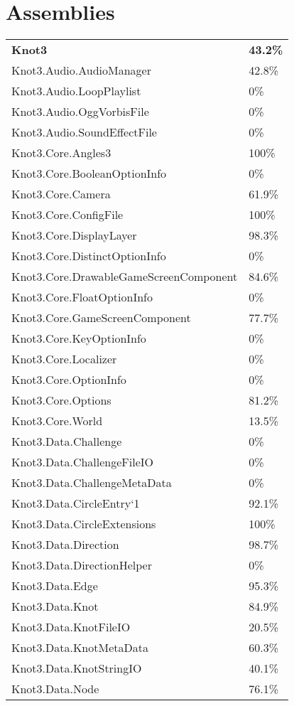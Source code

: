 \documentclass[a4paper,10pt]{article}
\begin{document}
\section{Assemblies}
\begin{longtable}[l]{ll}
\textbf{Knot3} & \textbf{43.2\%}\\
Knot3.Audio.AudioManager & 42.8\%\\
Knot3.Audio.LoopPlaylist & 0\%\\
Knot3.Audio.OggVorbisFile & 0\%\\
Knot3.Audio.SoundEffectFile & 0\%\\
Knot3.Core.Angles3 & 100\%\\
Knot3.Core.BooleanOptionInfo & 0\%\\
Knot3.Core.Camera & 61.9\%\\
Knot3.Core.ConfigFile & 100\%\\
Knot3.Core.DisplayLayer & 98.3\%\\
Knot3.Core.DistinctOptionInfo & 0\%\\
Knot3.Core.DrawableGameScreenComponent & 84.6\%\\
Knot3.Core.FloatOptionInfo & 0\%\\
Knot3.Core.GameScreenComponent & 77.7\%\\
Knot3.Core.KeyOptionInfo & 0\%\\
Knot3.Core.Localizer & 0\%\\
Knot3.Core.OptionInfo & 0\%\\
Knot3.Core.Options & 81.2\%\\
Knot3.Core.World & 13.5\%\\
Knot3.Data.Challenge & 0\%\\
Knot3.Data.ChallengeFileIO & 0\%\\
Knot3.Data.ChallengeMetaData & 0\%\\
Knot3.Data.CircleEntry`1 & 92.1\%\\
Knot3.Data.CircleExtensions & 100\%\\
Knot3.Data.Direction & 98.7\%\\
Knot3.Data.DirectionHelper & 0\%\\
Knot3.Data.Edge & 95.3\%\\
Knot3.Data.Knot & 84.9\%\\
Knot3.Data.KnotFileIO & 20.5\%\\
Knot3.Data.KnotMetaData & 60.3\%\\
Knot3.Data.KnotStringIO & 40.1\%\\
Knot3.Data.Node & 76.1\%\\

\end{longtable}
\end{document}
